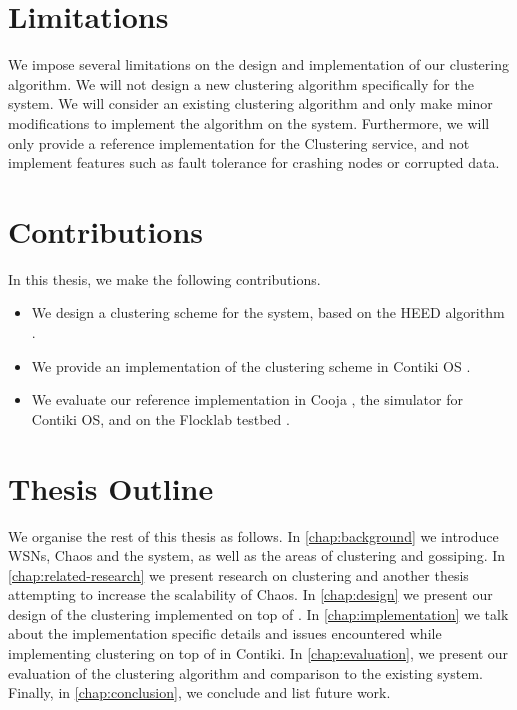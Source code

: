 \section{Limitations}
We impose several limitations on the design and implementation of our clustering algorithm. We will not design a new clustering algorithm specifically for the \atwo{} system. We will consider an existing clustering algorithm and only make minor modifications to implement the algorithm on the \atwo{} system. Furthermore, we will only provide a reference implementation for the Clustering service, and not implement features such as fault tolerance for crashing nodes or corrupted data.


\section{Contributions}
In this thesis, we make the following contributions.

\begin{itemize}
    \item We design a clustering scheme for the \atwo{} system, based on the HEED algorithm \cite{Younis2004-HEED}.
    \item We provide an implementation of the clustering scheme in Contiki OS \cite{Dunkels2004-contiki-introduction}.
    \item We evaluate our reference implementation in Cooja \cite{Osterlind2006-cooja-introduction}, the simulator for Contiki OS, and on the Flocklab testbed \cite{Lim2013-flocklab-introduction}.
\end{itemize}

\section{Thesis Outline}
We organise the rest of this thesis as follows. In \cref{chap:background} we introduce WSNs, Chaos and the \atwo{} system, as well as the areas of clustering and gossiping. In \cref{chap:related-research} we present research on clustering and another thesis attempting to increase the scalability of Chaos. In \cref{chap:design} we present our design of the clustering implemented on top of \atwo{}. In \cref{chap:implementation} we talk about the implementation specific details and issues encountered while implementing clustering on top of \atwo{} in Contiki. In \cref{chap:evaluation}, we present our evaluation of the clustering algorithm and comparison to the existing \atwo{} system. Finally, in \cref{chap:conclusion}, we conclude and list future work.
